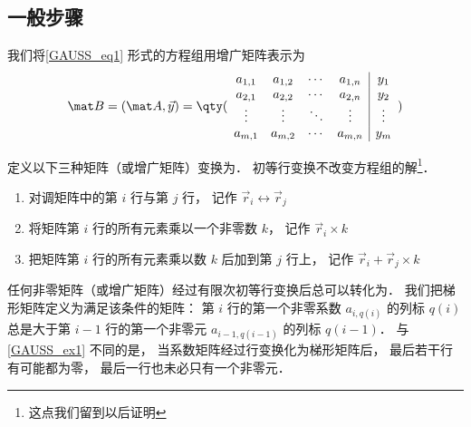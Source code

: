 \subsection{一般步骤}

我们将\autoref{GAUSS_eq1} 形式的方程组用增广矩阵表示为
\begin{equation} %
\mat B=(\mat A ,\vec y)={
	\qty( \begin{array}{cccc|c}
	a_{1,1} &a_{1,2} &\cdots &a_{1,n} &y_1 \\
	a_{2,1} &a_{2,2} &\cdots &a_{2,n} &y_2 \\
	\vdots  &\vdots  &\ddots &\vdots  &\vdots \\
	a_{m,1} &a_{m,2} &\cdots &a_{m,n} &y_m \\
	\end{array} 
	)}
\end{equation}

定义以下三种矩阵（或增广矩阵）变换为． 初等行变换不改变方程组的解\footnote{这点我们留到以后证明}．%
\begin{enumerate}
\item 对调矩阵中的第 $i$ 行与第 $j$ 行， 记作 $\vec r_i \leftrightarrow \vec r_j$

\item 将矩阵第 $i$ 行的所有元素乘以一个非零数 $k$， 记作 $\vec r_i \times k$

\item 把矩阵第 $i$ 行的所有元素乘以数 $k$ 后加到第 $j$ 行上， 记作 $\vec r_i + \vec r_j \times k$
\end{enumerate}

任何非零矩阵（或增广矩阵）经过有限次初等行变换后总可以转化为． 我们把梯形矩阵定义为满足该条件的矩阵： 第 $i$ 行的第一个非零系数 $a_{i,q(i)}$ 的列标 $q(i)$ 总是大于第 $i-1$ 行的第一个非零元 $a_{i-1, q(i-1)}$ 的列标 $q(i-1)$． 与\autoref{GAUSS_ex1} 不同的是， 当系数矩阵经过行变换化为梯形矩阵后， 最后若干行有可能都为零， 最后一行也未必只有一个非零元．

